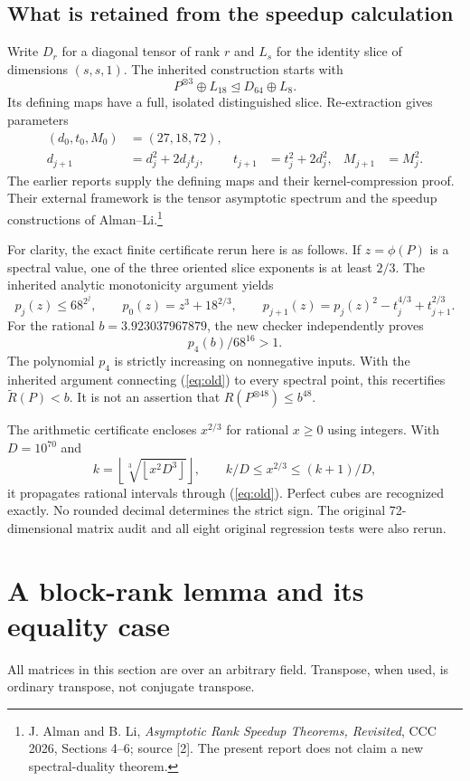 \documentclass[11pt,letterpaper]{article}
\theoremstyle{definition}\newtheorem{definition}[theorem]{Definition}
\theoremstyle{remark}\newtheorem{remark}[theorem]{Remark}
\newcommand{\AR}{\widetilde R}
\newcommand{\degto}{\trianglelefteq}
\begin{document}
\subsection{What is retained from the speedup calculation}
Write $D_r$ for a diagonal tensor of rank $r$ and $L_s$ for the identity slice of dimensions $(s,s,1)$. The inherited construction starts with
\[
P^{\otimes3}\oplus L_{18}\degto D_{64}\oplus L_8.
\]
Its defining maps have a full, isolated distinguished slice. Re-extraction gives parameters
\begin{align*}
(d_0,t_0,M_0)&=(27,18,72),\\
d_{j+1}&=d_j^2+2d_jt_j,&t_{j+1}&=t_j^2+2d_j^2,&M_{j+1}&=M_j^2.
\end{align*}
The earlier reports supply the defining maps and their kernel-compression proof. Their external framework is the tensor asymptotic spectrum and the speedup constructions of Alman--Li.\footnote{J. Alman and B. Li, \emph{Asymptotic Rank Speedup Theorems, Revisited}, CCC 2026, Sections 4--6; source [2]. The present report does not claim a new spectral-duality theorem.}

For clarity, the exact finite certificate rerun here is as follows. If $z=\phi(P)$ is a spectral value, one of the three oriented slice exponents is at least $2/3$. The inherited analytic monotonicity argument yields
\begin{equation}\label{eq:old}
p_j(z)\leq68^{2^j},\qquad
p_0(z)=z^3+18^{2/3},\qquad
p_{j+1}(z)=p_j(z)^2-t_j^{4/3}+t_{j+1}^{2/3}.
\end{equation}
For the rational $b=3.923037967879$, the new checker independently proves
\[
p_4(b)/68^{16}>1.
\]
The polynomial $p_4$ is strictly increasing on nonnegative inputs. With the inherited argument connecting (\ref{eq:old}) to every spectral point, this recertifies $\AR(P)<b$. It is not an assertion that $R(P^{\otimes48})\leq b^{48}$.

The arithmetic certificate encloses $x^{2/3}$ for rational $x\geq0$ using integers. With $D=10^{70}$ and
\[
k=\left\lfloor\sqrt[3]{\left\lfloor x^2D^3\right\rfloor}\right\rfloor,
\qquad k/D\leq x^{2/3}\leq(k+1)/D,
\]
it propagates rational intervals through (\ref{eq:old}). Perfect cubes are recognized exactly. No rounded decimal determines the strict sign. The original 72-dimensional matrix audit and all eight original regression tests were also rerun.

\section{A block-rank lemma and its equality case}
All matrices in this section are over an arbitrary field. Transpose, when used, is ordinary transpose, not conjugate transpose.
\end{document}
